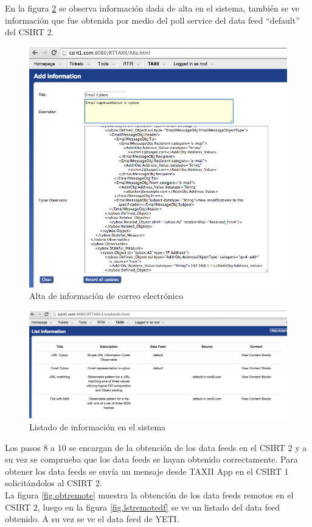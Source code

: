 En la figura \ref{fig.lstinfo} se observa información dada de alta en el sistema, también se ve información que fue obtenida por medio del poll service del data feed “default” del CSIRT 2.

\begin{figure}[h!]
	\centering
	\includegraphics[scale=0.6]{caso-de-estudio/alta.png}
	\caption{Alta de información de correo electrónico}
	\label{fig.altacorreo}
\end{figure}

\begin{figure}[h!]
	\centering
	\includegraphics[scale=0.3]{caso-de-estudio/listadoInfo.png}
	\caption{Listado de información en el sistema}
	\label{fig.lstinfo}
\end{figure}

Los pasos 8 a 10 se encargan de la obtención de los data feeds en el CSIRT 2 y a su vez se comprueba que los data feeds se hayan obtenido correctamente. Para obtener los data feeds se envía un mensaje desde TAXII App en el CSIRT 1 solicitándolos al CSIRT 2. \\
La figura \ref{fig.obtremote} muestra la obtención de los data feeds remotos en el CSIRT 2, luego en la figura \ref{fig.lstremotedf} se ve un listado del data feed obtenido. A su vez se ve el data feed de YETI.

